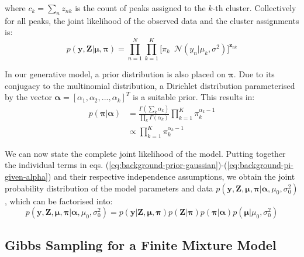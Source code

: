 where $c_{k} = \sum_n z_{nk}$ is the count of peaks assigned to the $k$-th cluster. Collectively for all peaks, the joint likelihood of the observed data and the cluster assignments is:
\begin{equation}
p(\boldsymbol{y},\boldsymbol{Z}  \vert \boldsymbol{\mu},\boldsymbol{\pi}) = \prod_{n=1}^{N} \prod_{k=1}^{K} \big[ \pi_k \enspace \mathcal{N}(y_n \vert \mu_k,\sigma^2) \big]^{\boldsymbol{z}_{nk}}
\label{eq:background-mixture-likelihood}
\end{equation}

In our generative model, a prior distribution is also placed on $\boldsymbol{\pi}$. Due to its conjugacy to the multinomial distribution, a Dirichlet distribution parameterised by the vector $\boldsymbol{\alpha}=[\alpha_1,\alpha_2,...,\alpha_k]^T$ is a suitable prior. This results in:
\begin{equation}
\begin{aligned}
p(\boldsymbol{\pi} \vert \boldsymbol{\alpha}) &= \frac{\Gamma(\sum_{k} \alpha_{k})}{\prod_{k} \Gamma(\alpha_k)}  \prod_{k=1}^{K} \pi_k^{\alpha_{k}-1} \\
                                                                      &\propto \prod_{k=1}^{K} \pi_k^{\alpha_{k}-1}
\end{aligned}
\label{eq:background-pi-given-alpha}
\end{equation}

We can now state the complete joint likelihood of the model. Putting together the individual terms in eqs. (\ref{eq:background-prior-gaussian})-(\ref{eq:background-pi-given-alpha}) and their respective independence assumptions, we obtain the joint probability distribution of the model parameters and data $p(\boldsymbol{y}, \boldsymbol{Z}, \boldsymbol{\mu}, \boldsymbol{\pi} \vert \boldsymbol{\alpha}, \allowbreak \mu_0,\sigma_0^2)$, which can be factorised into: 
\begin{equation}
p(\boldsymbol{y}, \boldsymbol{Z}, \boldsymbol{\mu}, \boldsymbol{\pi} \vert \boldsymbol{\alpha},\mu_0,\sigma_0^2) = p(\boldsymbol{y} \vert \boldsymbol{Z}, \boldsymbol{\mu},\boldsymbol{\pi}) p(\boldsymbol{Z} \vert \boldsymbol{\pi}) p(\boldsymbol{\pi} \vert \boldsymbol{\alpha}) p(\boldsymbol{\mu} \vert \mu_0, \sigma_0^2)
\label{eq:example-full-joint-dist}
\end{equation}

\subsection{Gibbs Sampling for a Finite Mixture Model}

